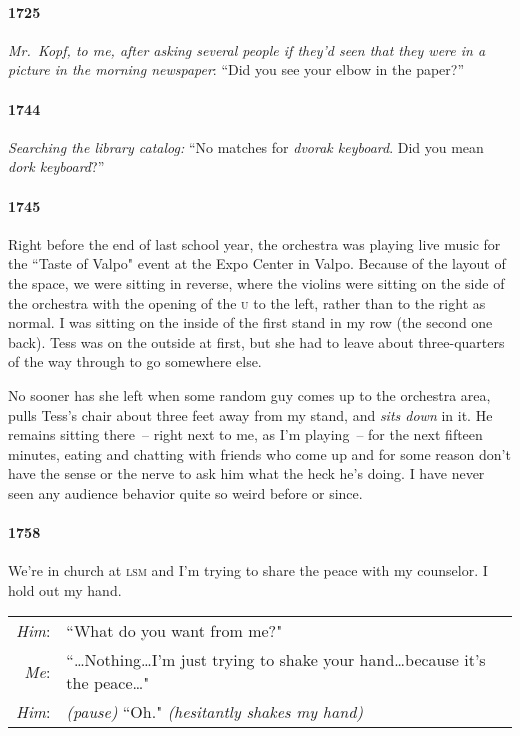 \documentclass[10pt]{memoir}
\newcommand{\speakertag}[1]{\emph{#1}: }
\newcommand{\st}{\speakertag}
\newcommand{\intro}[1]{\emph{#1}}
\begin{document}
\paragraph{1725} \intro{Mr.\ Kopf, to me, after asking several people if they'd seen that they were in a picture in the morning newspaper}: ``Did you see your elbow in the paper?''

\paragraph{1744} \intro{Searching the library catalog:} ``No matches for \emph{dvorak keyboard}. Did you mean \emph{dork keyboard}?''

\paragraph{1745} Right before the end of last school year, the orchestra was playing live music for the ``Taste of Valpo" event at the Expo Center in Valpo. Because of the layout of the space, we were sitting in reverse, where the violins were sitting on the side of the orchestra with the opening of the \textsc{u} to the left, rather than to the right as normal. I was sitting on the inside of the first stand in my row (the second one back). Tess was on the outside at first, but she had to leave about three-quarters of the way through to go somewhere else.

No sooner has she left when some random guy comes up to the orchestra area, pulls Tess's chair about three feet away from my stand, and \emph{sits down} in it. He remains sitting there~-- right next to me, as I'm playing~-- for the next fifteen minutes, eating and chatting with friends who come up and for some reason don't have the sense or the nerve to ask him what the heck he's doing. I have never seen any audience behavior quite so weird before or since.

\paragraph{1758}
We're in church at \textsc{lsm} and I'm trying to share the peace with my counselor. I hold out my hand.\\

\noindent \begin{tabularx}{\textwidth}{r X}
  \st{Him} & ``What do you want from me?"\\
  \st{Me} & ``\ldots Nothing\ldots I'm just trying to shake your hand\ldots because it's the peace\ldots"\\
  \st{Him} & \emph{(pause)} ``Oh." \emph{(hesitantly shakes my hand)}
\end{tabularx}
\end{document}
